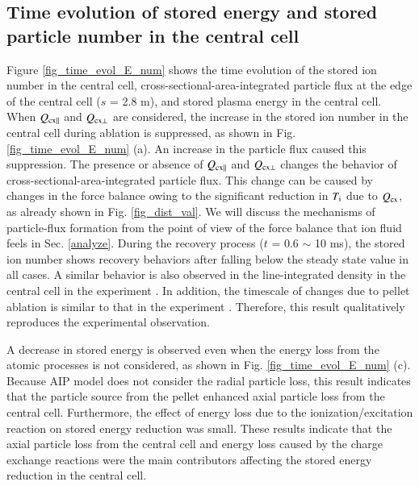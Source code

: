 \documentclass{jasse}%
\begin{document}
\subsection{Time evolution of stored energy and stored particle number in the central cell}
Figure \ref{fig_time_evol_E_num} shows the time evolution of the stored ion number in the central cell, cross-sectional-area-integrated particle flux at the edge of the central cell ($s$ = 2.8 m), and stored plasma energy in the central cell. When $Q_{\rm{cx\parallel}}$ and $Q_{\rm{cx\bot}}$ are considered, the increase in the stored ion number in the central cell during ablation is suppressed, as shown in Fig. \ref{fig_time_evol_E_num} (a). An increase in the particle flux caused this suppression. The presence or absence of $Q_{\rm{cx\parallel}}$ and $Q_{\rm{cx\bot}}$ changes the behavior of cross-sectional-area-integrated particle flux. This change can be caused by changes in the force balance owing to the significant reduction in $T_{\rm{i}}$ due to $Q_{\rm{cx}}$, as already shown in Fig. \ref{fig_dist_val}. We will discuss the mechanisms of particle-flux formation from the point of view of the force balance that ion fluid feels in Sec. \ref{analyze}. During the recovery process ($t$ = 0.6 $\sim$ 10 ms), the stored ion number shows recovery behaviors after falling below the steady state value in all cases. A similar behavior is also observed in the line-integrated density in the central cell in the experiment \cite{yoshikawa24}. In addition, the timescale of changes due to pellet ablation is similar to that in the experiment \cite{yoshikawa24}. Therefore, this result qualitatively reproduces the experimental observation.

A decrease in stored energy is observed even when the energy loss from the atomic processes is not considered, as shown in Fig. \ref{fig_time_evol_E_num} (c). 
Because AIP model does not consider the radial particle loss, this result indicates that the particle source from the pellet enhanced axial particle loss from the central cell. Furthermore, the effect of energy loss due to the ionization/excitation reaction on stored energy reduction was small. These results indicate that the axial particle loss from the central cell and energy loss caused by the charge exchange reactions were the main contributors affecting the stored energy reduction in the central cell.
\end{document}
